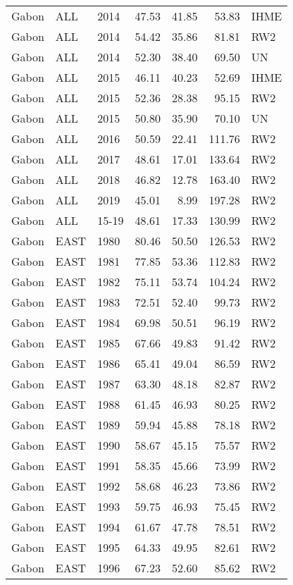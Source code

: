 \begin{longtable}{lllrrrl}
  Gabon & ALL & 2014 & 47.53 & 41.85 & 53.83 & IHME \\ 
  Gabon & ALL & 2014 & 54.42 & 35.86 & 81.81 & RW2 \\ 
  Gabon & ALL & 2014 & 52.30 & 38.40 & 69.50 & UN \\ 
  Gabon & ALL & 2015 & 46.11 & 40.23 & 52.69 & IHME \\ 
  Gabon & ALL & 2015 & 52.36 & 28.38 & 95.15 & RW2 \\ 
  Gabon & ALL & 2015 & 50.80 & 35.90 & 70.10 & UN \\ 
  Gabon & ALL & 2016 & 50.59 & 22.41 & 111.76 & RW2 \\ 
  Gabon & ALL & 2017 & 48.61 & 17.01 & 133.64 & RW2 \\ 
  Gabon & ALL & 2018 & 46.82 & 12.78 & 163.40 & RW2 \\ 
  Gabon & ALL & 2019 & 45.01 & 8.99 & 197.28 & RW2 \\ 
  Gabon & ALL & 15-19 & 48.61 & 17.33 & 130.99 & RW2 \\ 
  Gabon & EAST & 1980 & 80.46 & 50.50 & 126.53 & RW2 \\ 
  Gabon & EAST & 1981 & 77.85 & 53.36 & 112.83 & RW2 \\ 
  Gabon & EAST & 1982 & 75.11 & 53.74 & 104.24 & RW2 \\ 
  Gabon & EAST & 1983 & 72.51 & 52.40 & 99.73 & RW2 \\ 
  Gabon & EAST & 1984 & 69.98 & 50.51 & 96.19 & RW2 \\ 
  Gabon & EAST & 1985 & 67.66 & 49.83 & 91.42 & RW2 \\ 
  Gabon & EAST & 1986 & 65.41 & 49.04 & 86.59 & RW2 \\ 
  Gabon & EAST & 1987 & 63.30 & 48.18 & 82.87 & RW2 \\ 
  Gabon & EAST & 1988 & 61.45 & 46.93 & 80.25 & RW2 \\ 
  Gabon & EAST & 1989 & 59.94 & 45.88 & 78.18 & RW2 \\ 
  Gabon & EAST & 1990 & 58.67 & 45.15 & 75.57 & RW2 \\ 
  Gabon & EAST & 1991 & 58.35 & 45.66 & 73.99 & RW2 \\ 
  Gabon & EAST & 1992 & 58.68 & 46.23 & 73.86 & RW2 \\ 
  Gabon & EAST & 1993 & 59.75 & 46.93 & 75.45 & RW2 \\ 
  Gabon & EAST & 1994 & 61.67 & 47.78 & 78.51 & RW2 \\ 
  Gabon & EAST & 1995 & 64.33 & 49.95 & 82.61 & RW2 \\ 
  Gabon & EAST & 1996 & 67.23 & 52.60 & 85.62 & RW2 \\ 

\end{longtable}
